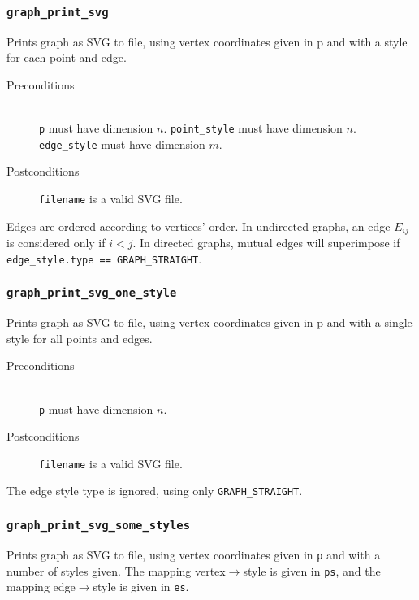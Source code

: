 \subsubsection{\texttt{graph\_print\_svg}}

Prints graph as SVG to file, using vertex coordinates given in p and with a 
style for each point and edge.

\begin{description}
 \item[Preconditions]~\\
   \texttt{p} must have dimension $n$.
   \texttt{point\_style} must have dimension $n$.
   \texttt{edge\_style} must have dimension $m$.
 \item[Postconditions]
   \texttt{filename} is a valid SVG file.
\end{description}

Edges are ordered according to vertices' order. In undirected graphs, 
an edge $E_{ij}$ is considered only if $i < j$. In directed graphs,
mutual edges will superimpose if \texttt{edge\_style.type == GRAPH\_STRAIGHT}.

\subsubsection{\texttt{graph\_print\_svg\_one\_style}}

Prints graph as SVG to file, using vertex coordinates given in p and with a 
single style for all points and edges.

\begin{description}
 \item[Preconditions]~\\
   \texttt{p} must have dimension $n$.
 \item[Postconditions]
   \texttt{filename} is a valid SVG file.
\end{description}

The edge style type is ignored, using only \texttt{GRAPH\_STRAIGHT}.

\subsubsection{\texttt{graph\_print\_svg\_some\_styles}}

Prints graph as SVG to file, using vertex coordinates given in \texttt{p} and
with a number of styles given. The mapping vertex$\to$style is given in \texttt{ps},
and the mapping edge$\to$style is given in \texttt{es}.


